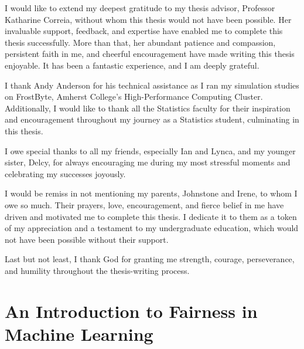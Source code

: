 \documentclass[12pt, twoside]{amherstthesis}
\begin{document}
  \begin{acknowledgments}
    I would like to extend my deepest gratitude to my thesis advisor, Professor Katharine Correia, without whom this thesis would not have been possible. Her invaluable support, feedback, and expertise have enabled me to complete this thesis successfully. More than that, her abundant patience and compassion, persistent faith in me, and cheerful encouragement have made writing this thesis enjoyable. It has been a fantastic experience, and I am deeply grateful.

    I thank Andy Anderson for his technical assistance as I ran my simulation studies on FrostByte, Amherst College's High-Performance Computing Cluster. Additionally, I would like to thank all the Statistics faculty for their inspiration and encouragement throughout my journey as a Statistics student, culminating in this thesis.

    I owe special thanks to all my friends, especially Ian and Lynca, and my younger sister, Delcy, for always encouraging me during my most stressful moments and celebrating my successes joyously.

    I would be remiss in not mentioning my parents, Johnstone and Irene, to whom I owe so much. Their prayers, love, encouragement, and fierce belief in me have driven and motivated me to complete this thesis. I dedicate it to them as a token of my appreciation and a testament to my undergraduate education, which would not have been possible without their support.

    Last but not least, I thank God for granting me strength, courage, perseverance, and humility throughout the thesis-writing process.
  \end{acknowledgments}

  \hypersetup{linkcolor=black}
  \setcounter{tocdepth}{2}
  \tableofcontents

  \listoftables

  \listoffigures


\mainmatter %
\pagestyle{fancyplain} %

\hypertarget{intro}{%
\chapter{An Introduction to Fairness in Machine Learning}\label{intro}}
\end{document}
